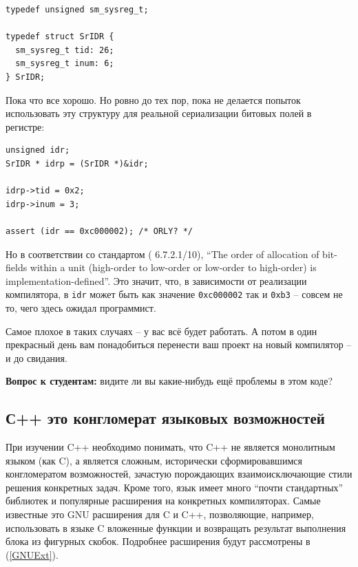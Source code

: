\documentclass[a4paper,12pt,oneside]{article}
\newif\ifanswers
\begin{document}
\begin{lstlisting}
typedef unsigned sm_sysreg_t;

typedef struct SrIDR {
  sm_sysreg_t tid: 26;
  sm_sysreg_t inum: 6;
} SrIDR;
\end{lstlisting}

Пока что все хорошо. Но ровно до тех пор, пока не делается попыток использовать эту структуру для реальной сериализации битовых полей в регистре:

\begin{lstlisting}
unsigned idr;
SrIDR * idrp = (SrIDR *)&idr;

idrp->tid = 0x2;
idrp->inum = 3;

assert (idr == 0xc000002); /* ORLY? */
\end{lstlisting}

Но в соответствии со стандартом (\cite{stdc11} 6.7.2.1/10), ``The order of allocation of bit-fields within a unit (high-order to low-order or low-order to high-order) is implementation-defined''. Это значит, что, в зависимости от реализации компилятора, в \lstinline!idr! может быть как значение \lstinline!0xc000002! так и \lstinline!0xb3! -- совсем не то, чего здесь ожидал программист.

Самое плохое в таких случаях -- у вас всё будет работать. А потом в один прекрасный день вам понадобиться перенести ваш проект на новый компилятор -- и до свидания.

\textbf{Вопрос к студентам:} видите ли вы какие-нибудь ещё проблемы в этом коде?

\ifanswers
Правильный ответ: разумеется тип \lstinline!unsigned! не обязан быть 32-битным. Это также implementation-defined будет ли он таким. Для верности в таких случаях лучше использовать \lstinline!uint32_t!.
\fi

\subsection{С++ это конгломерат языковых возможностей}\label{CppNature}

При изучении C++ необходимо понимать, что C++ не является монолитным языком (как C), а является сложным, исторически сформировавшимся конгломератом возможностей, зачастую порождающих взаимоисключающие стили решения конкретных задач. Кроме того, язык имеет много ``почти стандартных'' библиотек и популярные расширения на конкретных компиляторах. Самые известные это GNU расширения для C и C++, позволяющие, например, использовать в языке C вложенные функции и возвращать результат выполнения блока из фигурных скобок. Подробнее расширения будут рассмотрены в (\ref{GNUExt}).
\end{document}

